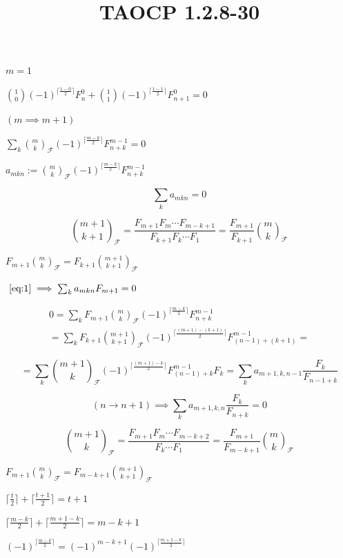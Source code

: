 \documentclass{article}
\title{TAOCP 1.2.8\mbox{-}30}
\begin{document}
\maketitle

\( m = 1 \)

\( \binom{1}{0}{(-1)}^{\lceil\frac{1-0}{2}\rceil} F_{n}^{0} + \binom{1}{1}{(-1)}^{\lceil\frac{1-1}{2}\rceil} F_{n+1}^{0} = 0 \)

\( (m \implies m + 1) \)

\( \sum_{k}\binom{m}{k}_{\mathcal{F}}{(-1)}^{\lceil\frac{m-k}{2}\rceil}F_{n+k}^{m-1} = 0 \)

\( a_{mkn} := \binom{m}{k}_{\mathcal{F}}{(-1)}^{\lceil\frac{m-k}{2}\rceil}F_{n+k}^{m-1} \)

\[\sum_{k} a_{mkn} = 0 \tag{1}\label{eq:1}\]

\[ \binom{m+1}{k+1}_{\mathcal{F}} = \frac{F_{m+1}F_{m}\cdots F_{m-k+1}}{F_{k+1}F_{k}\cdots F_{1}} = \frac{F_{m+1}}{F_{k+1}} \binom{m}{k}_{\mathcal{F}} \]

\( F_{m+1} \binom{m}{k}_{\mathcal{F}} = F_{k+1} \binom{m+1}{k+1}_{\mathcal{F}} \)

\(~\eqref{eq:1} \implies \sum_{k} a_{mkn}F_{m+1} = 0 \)

\begin{multline*}
0 = \sum_{k} F_{m+1}\binom{m}{k}_{\mathcal{F}}{(-1)}^{\lceil\frac{m-k}{2}\rceil}F_{n+k}^{m-1} \\
= \sum_{k} F_{k+1}\binom{m+1}{k+1}_{\mathcal{F}}{(-1)}^{\lceil\frac{(m+1)-(k+1)}{2}\rceil}F_{(n-1)+(k+1)}^{m-1} =
\end{multline*}

\[ = \sum_{k} \binom{m+1}{k}_{\mathcal{F}}{(-1)}^{\lceil\frac{(m+1)-k}{2}\rceil}F_{(n-1)+k}^{m-1}F_{k} = \sum_{k} a_{m+1,k,n-1}\frac{F_{k}}{F_{n-1+k}} \]

\[(n \to n + 1) \implies \sum_{k} a_{m+1,k,n}\frac{F_{k}}{F_{n+k}} = 0 \tag{2}\label{eq:2}\]

\[ \binom{m+1}{k}_{\mathcal{F}} = \frac{F_{m+1}F_{m}\cdots F_{m-k+2}}{F_{k}\cdots F_{1}} = \frac{F_{m+1}}{F_{m-k+1}} \binom{m}{k}_{\mathcal{F}} \]

\( F_{m+1} \binom{m}{k}_{\mathcal{F}} = F_{m-k+1} \binom{m+1}{k+1}_{\mathcal{F}} \)

\( \lceil \frac{t}{2} \rceil + \lceil \frac{t+1}{2} \rceil = t+1 \)

\( \lceil \frac{m-k}{2} \rceil + \lceil \frac{m+1-k}{2} \rceil = m-k+1 \)

\( {(-1)}^{\lceil \frac{m-k}{2} \rceil} = {(-1)}^{m-k+1} {(-1)}^{\lceil \frac{m + 1 -k}{2} \rceil} \)
\end{document}
